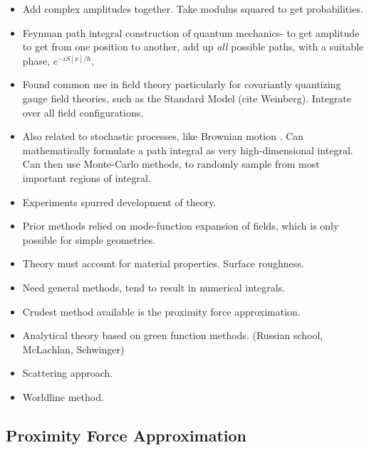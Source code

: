 \begin{itemize}
\begin{itemize}
\item Add complex amplitudes together.  Take modulus squared to get probabilities.  
\item Feynman path integral construction of quantum mechanics- 
to get amplitude to get from one position to another, add up \emph{all} possible paths,
 with a suitable phase, $e^{-i S[x]/\hbar}$, \cite{Feynman1942, Feynman1965}
\item Found common use in field theory particularly for covariantly quantizing gauge field theories,
 such as the Standard Model (cite Weinberg).  Integrate over all field configurations.  
\item  Also related to stochastic processes, like Brownian motion \cite{Karatzas1991}.
   Can mathematically formulate a path integral as very high-dimensional integral.
  Can then use Monte-Carlo methods, to randomly sample from most important regions of integral.  
\end{itemize}

\begin{itemize}
\item Experiments spurred development of theory.  
\item Prior methods relied on mode-function expansion of fields, which is only possible
for simple geometries.  
\item Theory must account for material properties.  Surface roughness.  
\item Need general methods, tend to result in numerical integrals.
\item Crudest method available is the proximity force approximation.  
\item Analytical theory based on green function methods.  (Russian school, McLachlan, Schwinger)
\item Scattering approach.  
\item Worldline method.  
\end{itemize}

\subsection{Proximity Force Approximation}


\end{itemize}
